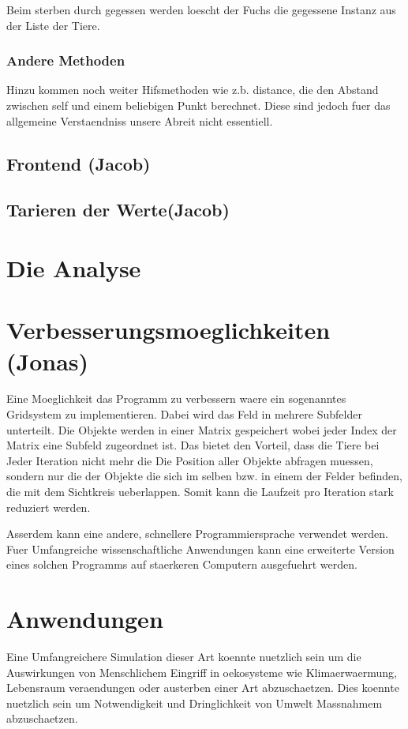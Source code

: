 \documentclass[12pt]{article}
\begin{document}
Beim sterben durch gegessen werden loescht der Fuchs die gegessene Instanz aus der Liste der Tiere.
\subsubsection{Andere Methoden}
Hinzu kommen noch weiter Hifsmethoden wie z.b. \colorbox{gray!40}{distance}, die
den Abstand zwischen self und einem beliebigen Punkt berechnet.
Diese sind jedoch fuer das allgemeine Verstaendniss unsere Abreit nicht essentiell.
\subsection{Frontend (Jacob)}
\subsection{Tarieren der Werte(Jacob)}
\section{Die Analyse}
\section{Verbesserungsmoeglichkeiten (Jonas)}
Eine Moeglichkeit das Programm zu verbessern waere ein sogenanntes Gridsystem zu implementieren.
Dabei wird das Feld in mehrere Subfelder unterteilt.
Die Objekte werden in einer Matrix gespeichert wobei jeder Index der Matrix eine Subfeld zugeordnet ist.
Das bietet den Vorteil, dass die Tiere bei Jeder Iteration nicht mehr die Die
Position aller Objekte abfragen muessen, sondern nur die der Objekte die sich im
selben bzw. in einem der Felder befinden, die mit dem Sichtkreis ueberlappen.
Somit kann die Laufzeit pro Iteration stark reduziert werden.

Asserdem kann eine andere, schnellere Programmiersprache verwendet werden.
Fuer Umfangreiche wissenschaftliche Anwendungen kann eine erweiterte Version
eines solchen Programms auf staerkeren Computern ausgefuehrt werden.
\section{Anwendungen}
Eine Umfangreichere Simulation dieser Art koennte nuetzlich sein um die Auswirkungen von Menschlichem Eingriff in oekosysteme wie Klimaerwaermung, Lebensraum veraendungen oder austerben einer Art abzuschaetzen.
Dies koennte nuetzlich sein um Notwendigkeit und Dringlichkeit von Umwelt Massnahmem abzuschaetzen.
\end{document}
